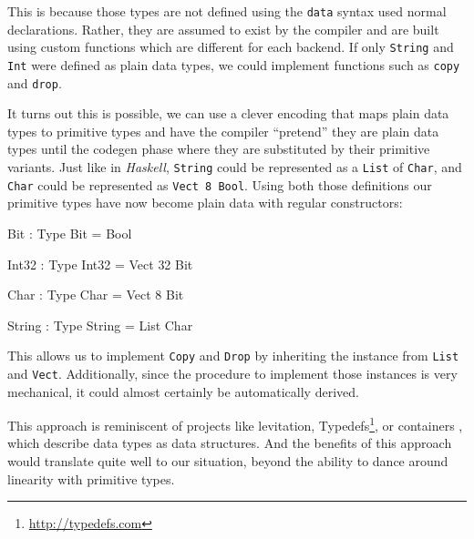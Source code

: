 \documentclass[
]{article}
\newenvironment{Shaded}{}{}
\newcommand{\DataTypeTok}[1]{\textcolor[rgb]{0.56,0.13,0.00}{#1}}
\newcommand{\DecValTok}[1]{\textcolor[rgb]{0.25,0.63,0.44}{#1}}
\newcommand{\OperatorTok}[1]{\textcolor[rgb]{0.40,0.40,0.40}{#1}}
\newcommand{\OtherTok}[1]{\textcolor[rgb]{0.00,0.44,0.13}{#1}}
\begin{document}
This is because those types are not defined using the \texttt{data}
syntax used normal declarations. Rather, they are assumed to exist by
the compiler and are built using custom functions which are different
for each backend. If only \texttt{String} and \texttt{Int} were defined
as plain data types, we could implement functions such as \texttt{copy}
and \texttt{drop}.

It turns out this is possible, we can use a clever encoding that maps
plain data types to primitive types and have the compiler ``pretend''
they are plain data types until the codegen phase where they are
substituted by their primitive variants. Just like in \emph{Haskell},
\texttt{String} could be represented as a \texttt{List} of
\texttt{Char}, and \texttt{Char} could be represented as
\texttt{Vect\ 8\ Bool}. Using both those definitions our primitive types
have now become plain data with regular constructors:

\begin{Shaded}
\begin{Highlighting}[]
\DataTypeTok{Bit} \OperatorTok{:} \DataTypeTok{Type}
\DataTypeTok{Bit} \OtherTok{=} \DataTypeTok{Bool}

\DataTypeTok{Int32} \OperatorTok{:} \DataTypeTok{Type}
\DataTypeTok{Int32} \OtherTok{=} \DataTypeTok{Vect} \DecValTok{32} \DataTypeTok{Bit}

\DataTypeTok{Char} \OperatorTok{:} \DataTypeTok{Type}
\DataTypeTok{Char} \OtherTok{=} \DataTypeTok{Vect} \DecValTok{8} \DataTypeTok{Bit}

\DataTypeTok{String} \OperatorTok{:} \DataTypeTok{Type}
\DataTypeTok{String} \OtherTok{=} \DataTypeTok{List} \DataTypeTok{Char}
\end{Highlighting}
\end{Shaded}

This allows us to implement \texttt{Copy} and \texttt{Drop} by
inheriting the instance from \texttt{List} and \texttt{Vect}.
Additionally, since the procedure to implement those instances is very
mechanical, it could almost certainly be automatically derived.

This approach is reminiscent of projects like
levitation\cite{levitation}, Typedefs\footnote{\url{http://typedefs.com}},
or containers\cite{indexed_containers} , which describe data types as
data structures. And the benefits of this approach would translate quite
well to our situation, beyond the ability to dance around linearity with
primitive types.
\end{document}

